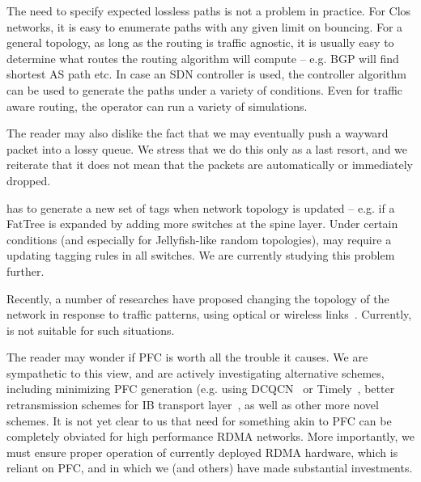 The need to specify expected
lossless paths is not a problem in practice. For Clos networks, it is easy to
enumerate paths with any given limit on bouncing. For a general topology, as long
as the routing is traffic agnostic, it is usually easy to determine what routes
the routing algorithm will compute -- e.g. BGP will find shortest AS path etc.
In case an SDN controller is used, the controller algorithm can be used to
generate the paths under a variety of conditions. Even for traffic aware
routing, the operator can run a variety of simulations.

The reader may also dislike the fact that we may eventually push a wayward
packet into a lossy queue. We stress that we do this only as a last resort, and
we reiterate that it does not mean that the packets are automatically or
immediately dropped.

 \sysname{} has to generate a new set of
tags when network topology is updated -- e.g. if a FatTree is expanded by adding
more switches at the spine layer. Under certain conditions (and especially for
Jellyfish-like random topologies), \sysname{} may require a updating tagging
rules in all switches. We are currently studying this problem further. 

 Recently, a number of researches have proposed
changing the topology of the network in response to traffic patterns, using
optical or wireless links~\cite{helios,flyways,projector,mirrormirror}.
Currently, \sysname{} is not suitable for such situations. 

 The reader may wonder if PFC is worth all the trouble
it causes. We are sympathetic to this view, and are actively investigating
alternative schemes, including minimizing PFC generation (e.g.  using
DCQCN~\cite{dcqcn} or Timely~\cite{timely}, better retransmission schemes for IB
transport layer~\cite{xxx}, as well as other more novel schemes.  It is not yet
clear to us that need for something akin to PFC can be completely obviated for
high performance RDMA networks. More importantly, we must ensure proper
operation of currently deployed RDMA hardware, which is reliant on PFC, and in
which we (and others) have made substantial investments.

